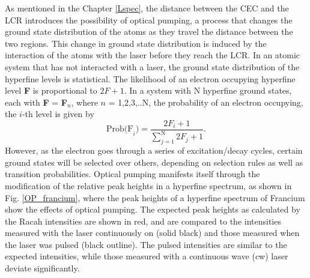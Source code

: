 \noindent As mentioned in the Chapter \ref{Lspec}, the distance between the CEC and the LCR introduces the possibility of optical pumping, a process that changes the ground state distribution of the atoms as they travel the distance between the two regions. This change in ground state distribution is induced by the interaction of the atoms with the laser before they reach the LCR. In an atomic system that has not interacted with a laser, the ground state distribution of the hyperfine levels is statistical.\cite{townsend} The likelihood of an electron occupying hyperfine level \textbf{F} is proportional to $2F+1$. In a system with N hyperfine ground states, each with \textbf{F} = \textbf{F}$_n$, where $n$ = 1,2,3,..N, the probability of an electron occupying, the $i$-th level is given by \cite{townsend}
\begin{equation}
\mathrm{Prob(F}_i) = \frac{2F_i+1}{\sum_{j=1}^\mathrm{N}2F_j+1}.
\end{equation}
However, as the electron goes through a series of excitation/decay cycles, certain ground states will be selected over others, depending on selection rules as well as transition probabilities. Optical pumping manifests itself through the modification of the relative peak heights in a hyperfine spectrum, as shown in Fig. \ref{OP_francium}, where the peak heights of a hyperfine spectrum of Francium show the effects of optical pumping. The expected peak heights as calculated by the Racah intensities are shown in red, and are compared to the intensities measured with the laser continuously on (solid black) and those measured when the laser was pulsed (black outline). The pulsed intensities are similar to the expected intensities, while those measured with a continuous wave (cw) laser deviate significantly.
